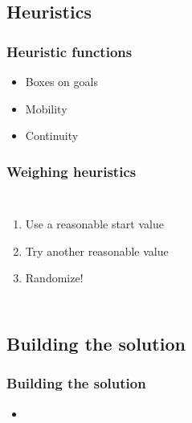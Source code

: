\documentclass[]{beamer}
\begin{document}
\subsection{Heuristics}
\begin{frame}
	\frametitle{Heuristic functions}
	\begin{itemize}
		\item{Boxes on goals}
		\item{Mobility}
		\item{Continuity}
	\end{itemize}
\end{frame}

\begin{frame}
	\frametitle{Weighing heuristics}
	\begin{columns}
	\begin{enumerate}
		\item{Use a reasonable start value}
		\item{Try another reasonable value}
		\item{Randomize!}
	\end{enumerate}
	\end{columns}
\end{frame}

\subsection{Building the solution}
\begin{frame}
	\frametitle{Building the solution}
	\begin{itemize}
		\item{}
	\end{itemize}
\end{frame}
\end{document}
